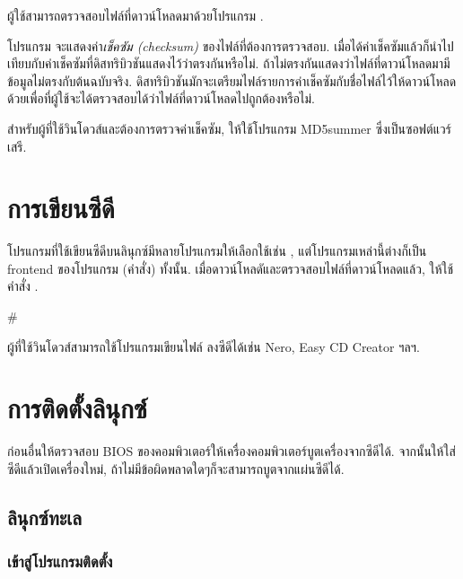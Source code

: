 \begin{thwbr}
ผู้ใช้สามารถตรวจสอบไฟล์ที่ดาวน์โหลดมาด้วยโปรแกรม . %
%
โปรแกรม  จะแสดงค่า\emph{เช็คซัม (checksum)} ของไฟล์ที่ต้องการตรวจสอบ. เมื่อได้ค่าเช็คซัมแล้วก็นำไปเทียบกับค่าเช็คซัมที่ดิสทริบิวชันแสดงไว้ว่าตรงกันหรือไม่. ถ้าไม่ตรงกันแสดงว่าไฟล์ที่ดาวน์โหลดมามีข้อมูลไม่ตรงกับต้นฉบับจริง. ดิสทริบิวชันมักจะเตรียมไฟล์รายการค่าเช็คซัมกับชื่อไฟล์ไว้ให้ดาวน์โหลดด้วยเพื่อที่ผู้ใช้จะได้ตรวจสอบได้ว่าไฟล์ที่ดาวน์โหลดไปถูกต้องหรือไม่.

สำหรับผู้ที่ใช้วินโดวส์และต้องการตรวจค่าเช็คซัม, ให้ใช้โปรแกรม MD5summer \cite{md5summer} ซึ่งเป็นซอฟต์แวร์เสรี.

\section{การเขียนซีดี}
โปรแกรมที่ใช้เขียนซีดีบนลินุกซ์มีหลายโปรแกรมให้เลือกใช้เช่น ,  แต่โปรแกรมเหล่านี้ต่างก็เป็น frontend ของโปรแกรม (คำสั่ง)  ทั้งนั้น. เมื่อดาวน์โหลดัและตรวจสอบไฟล์ที่ดาวน์โหลดแล้ว, ให้ใช้คำสั่ง . 

\begin{MyVerbatim}
# 
\end{MyVerbatim} 

ผู้ที่ใช้วินโดวส์สามารถใช้โปรแกรมเขียนไฟล์  ลงซีดีได้เช่น Nero, Easy CD Creator ฯลฯ.
\section{การติดตั้งลินุกซ์}
ก่อนอื่นให้ตรวจสอบ BIOS ของคอมพิวเตอร์ให้เครื่องคอมพิวเตอร์บูตเครื่องจากซีดีได้. จากนั้นให้ใส่ซีดีแล้วเปิดเครื่องใหม่, ถ้าไม่มีข้อผิดพลาดใดๆก็จะสามารถบูตจากแผ่นซีดีได้.

\subsection{ลินุกซ์ทะเล}

\vfill
\subsubsection*{เข้าสู่โปรแกรมติดตั้ง}
\end{thwbr}
